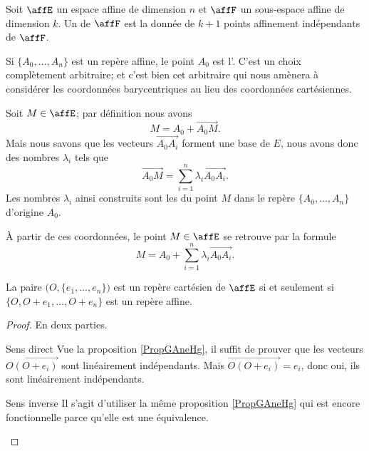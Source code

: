 \begin{definition}  \label{DefguuwEO}
    Soit \( \affE\) un espace affine de dimension \( n\) et \( \affF\) un sous-espace affine de dimension \( k\). Un  de \( \affF\) est la donnée de \( k+1\) points affinement indépendants de \( \affF\).
\end{definition}
Si \( \{ A_0,\ldots, A_n \}\) est un repère affine, le point \( A_0\) est l'. C'est un choix complètement arbitraire; et c'est bien cet arbitraire qui nous amènera à considérer les coordonnées barycentriques au lieu des coordonnées cartésiennes.

Soit \( M\in \affE\); par définition nous avons
\begin{equation}
    M=A_0+\overrightarrow{ A_0M }.
\end{equation}
Mais nous savons que les vecteurs \( \overrightarrow{ A_0A_i }\) forment une base de \( E\), nous avons donc des nombres \( \lambda_i\) tels que
\begin{equation}
    \overrightarrow{ A_0M }=\sum_{i=1}^n\lambda_i\overrightarrow{ A_0A_i }.
\end{equation}
Les nombres \( \lambda_i\) ainsi construits sont les  du point \( M\) dans le repère \( \{ A_0,\ldots, A_n \}\) d'origine \( A_0\).

À partir de ces coordonnées, le point \( M\in\affE\) se retrouve par la formule
\begin{equation}
    M=A_0+\sum_{i=1}^n\lambda_i\overrightarrow{ A_0A_i }.
\end{equation}

\begin{proposition}      \label{PROPooIXVBooPpKsDE}
    La paire \( \big( O,\{ e_1,\ldots, e_n \} \big)\) est un repère cartésien de \( \affE\) si et seulement si \( \{ O,O+e_1,\ldots, O+e_n \}\) est un repère affine.
\end{proposition}

\begin{proof}
    En deux parties.
    \begin{subproof}
        \item[Sens direct]
            Vue la proposition \ref{PropGAneHg}, il suffit de prouver que les vecteurs $\overrightarrow{O(O+e_i)}$ sont linéairement indépendants. Mais \( \overrightarrow{O(O+e_i)}=e_i\), donc oui, ils sont linéairement indépendants.
        \item[Sens inverse]
            Il s'agit d'utiliser la même proposition \ref{PropGAneHg} qui est encore fonctionnelle parce qu'elle est une équivalence.
    \end{subproof}
\end{proof}

